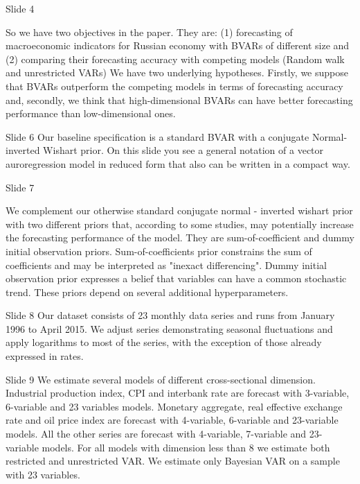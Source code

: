 \documentclass[12pt,a4paper,english,fleqn,oneside,openany]{article}
\begin{document}
Slide 4

So we have two objectives in the paper. They are: (1) forecasting of macroeconomic indicators for Russian economy with BVARs of different size and (2) comparing their forecasting accuracy with  competing  models (Random walk and unrestricted VARs)     
We have two underlying hypotheses. Firstly, we suppose that BVARs outperform the competing models in terms of forecasting accuracy and, secondly, we think that high-dimensional BVARs  can have  better forecasting performance than low-dimensional
ones.




Slide 6
Our baseline specification is a standard BVAR with a conjugate Normal-inverted Wishart prior. On this slide you see a general notation of a vector auroregression model in reduced form that also can be written in a compact way.

Slide 7 

We complement our otherwise standard conjugate normal - inverted wishart prior with two different priors that, according to some studies, may potentially increase the forecasting performance of the model. They are sum-of-coefficient and dummy initial observation priors. Sum-of-coefficients prior constrains the sum of coefficients and may be interpreted as "inexact differencing". Dummy initial observation prior expresses a belief that variables can have a common stochastic trend. These priors depend on several additional hyperparameters.

Slide 8
Our dataset consists of 23 monthly data series and runs from January 1996 to April 2015. We adjust series demonstrating seasonal fluctuations and apply logarithms to most of the series, with the exception of those already expressed in rates.

Slide 9
We estimate several models of different cross-sectional dimension. Industrial production index, CPI and interbank rate are forecast with 3-variable, 6-variable and 23 variables models. Monetary aggregate, real effective exchange rate and oil price index are forecast with 4-variable, 6-variable and 23-variable models. All the other series are forecast  with 4-variable, 7-variable and 23-variable models. For all models with dimension less than 8 we estimate both restricted and unrestricted VAR. We estimate only Bayesian VAR on a sample with 23 variables.
\end{document}
